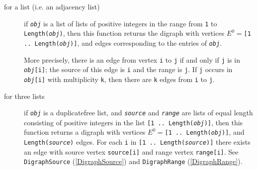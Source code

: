 \documentclass[a4paper,11pt]{report}
\begin{document}
{{{ 
\begin{description}
\item[{for a list (i.e. an adjacency list)}]  if \mbox{\texttt{\mdseries\slshape obj}} is a list of lists of positive integers in the range from \texttt{1} to \texttt{Length(\mbox{\texttt{\mdseries\slshape obj}})}, then this function returns the digraph with vertices $E ^ 0 = $\texttt{[1 .. Length(\mbox{\texttt{\mdseries\slshape obj}})]}, and edges corresponding to the entries of \mbox{\texttt{\mdseries\slshape obj}}. 

 More precisely, there is an edge from vertex \texttt{i} to \texttt{j} if and only if \texttt{j} is in \texttt{\mbox{\texttt{\mdseries\slshape obj}}[i]}; the source of this edge is \texttt{i} and the range is \texttt{j}. If \texttt{j} occurs in \texttt{\mbox{\texttt{\mdseries\slshape obj}}[i]} with multiplicity \texttt{k}, then there are \texttt{k} edges from \texttt{i} to \texttt{j}. 
\item[{for three lists}]  if \mbox{\texttt{\mdseries\slshape obj}} is a duplicate\texttt{}free list, and \mbox{\texttt{\mdseries\slshape source}} and \mbox{\texttt{\mdseries\slshape range}} are lists of equal length consisting of positive integers in the list \texttt{[1 .. Length(\mbox{\texttt{\mdseries\slshape obj}})]}, then this function returns a digraph with vertices $E ^ 0 = $\texttt{[1 .. Length(\mbox{\texttt{\mdseries\slshape obj}})]}, and \texttt{Length(\mbox{\texttt{\mdseries\slshape source}})} edges. For each \texttt{i} in \texttt{[1 .. Length(\mbox{\texttt{\mdseries\slshape source}})]} there exists an edge with source vertex \texttt{source[i]} and range vertex \texttt{range[i]}. See \texttt{DigraphSource} (\ref{DigraphSource}) and \texttt{DigraphRange} (\ref{DigraphRange}). 


\end{description}}}}
\end{document}
